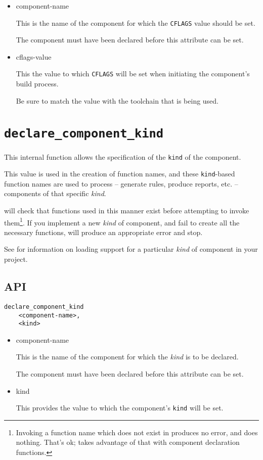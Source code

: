\begin{itemize}
\item component-name

  This is the name of the component for which the \texttt{CFLAGS}
  value should be set.

  The component must have been declared before this attribute can be
  set.

\item cflags-value

  This the value to which \texttt{CFLAGS} will be set when initiating
  the component's build process.

  Be sure to match the value with the toolchain that is being used.

\end{itemize}

\section{\texttt{declare\_component\_kind}}\label{api:kind}

This internal function allows the specification of the \texttt{kind}
of the component.

This value is used in the creation of function names, and these
\texttt{kind}-based function names are used to process -- generate
rules, produce reports, etc. -- components of that specific
\emph{kind}.

\lmsbw will check that functions used in this manner exist before
attempting to invoke them\footnote{Invoking a function name which does
  not exist in \gnumake produces no error, and does nothing.  That's
  ok; \lmsbw takes advantage of that with component declaration
  functions.}.  If you implement a new \emph{kind} of component, and
fail to create all the necessary functions, \lmsbw will produce an
appropriate error and stop.

See  for information on
loading support for a particular \emph{kind} of component in your
project.

\subsection{API}

\begin{verbatim}
declare_component_kind
    <component-name>,
    <kind>
\end{verbatim}

\begin{itemize}
\item component-name

  This is the name of the component for which the \emph{kind} is to be declared.

  The component must have been declared before this attribute can be
  set.

\item kind

  This provides the value to which the component's \texttt{kind} will
  be set.
\end{itemize}

